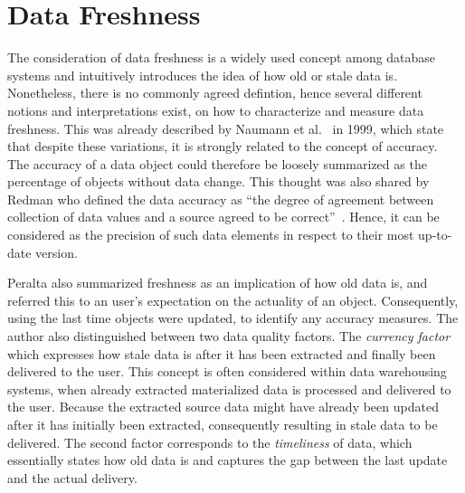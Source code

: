 
\section{Data Freshness}
\label{sec:definition}
The consideration of data freshness is a widely used concept among database systems and intuitively introduces the idea of how old or stale data is.
Nonetheless, there is no commonly agreed defintion, hence several different notions and interpretations exist, on how to characterize and measure data freshness.
This was already described by Naumann et al.~\cite{naumann:1999} in 1999, which state that despite these variations, it is strongly related to the concept of accuracy. 
The accuracy of a data object could therefore be loosely summarized as the percentage of objects without data change. 
This thought was also shared by Redman who defined the data accuracy as ``the degree of agreement between 
collection of data values and a source agreed to be correct''~\cite{redman:1996}.
Hence, it can be considered as the precision of such data elements in respect to their most up-to-date version.



Peralta \cite{peralta:2006} also summarized freshness as an implication of how old data is, and referred this to an user's expectation on the actuality of an object. 
Consequently, using the last time objects were updated, to identify any accuracy measures. The author also distinguished between two data quality factors. 
The \emph{currency factor} which expresses how stale data is after it has been extracted and finally been
delivered to the user. This concept is often considered within data warehousing systems, when already extracted materialized data is processed and delivered to the user.
Because the extracted source data might have already been updated after it has initially been extracted, consequently resulting in stale data to be delivered.
The second factor corresponds to the \emph{timeliness} of data, which essentially states how old data is and captures the gap between the last update and the actual delivery.



